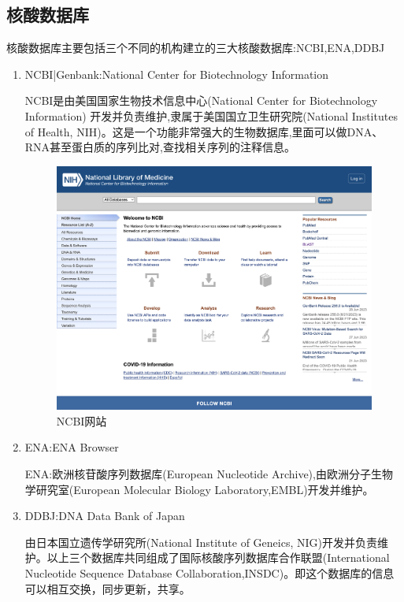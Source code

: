 \subsection {核酸数据库}
核酸数据库主要包括三个不同的机构建立的三大核酸数据库:NCBI,ENA,DDBJ
\begin{enumerate}
    \item NCBI|Genbank:National Center for Biotechnology Information

          NCBI是由美国国家生物技术信息中心(National Center for Biotechnology Information) 开发并负责维护,隶属于美国国立卫生研究院(National Institutes of Health, NIH)。这是一个功能非常强大的生物数据库,里面可以做DNA、RNA甚至蛋白质的序列比对,查找相关序列的注释信息。

          \begin{figure}[htbp]
              \centering
              \includegraphics[width=1.0\textwidth]{image/Alignment/NCBI.png}
              \caption{NCBI网站}
          \end{figure}

    \item ENA:ENA Browser

          ENA:欧洲核苷酸序列数据库(European Nucleotide Archive),由欧洲分子生物学研究室(European Molecular Biology Laboratory,EMBL)开发并维护。
    \item DDBJ:DNA Data Bank of Japan

          由日本国立遗传学研究所(National Institute of Geneics, NIG)开发并负责维护。以上三个数据库共同组成了国际核酸序列数据库合作联盟(International Nucleotide Sequence Database Collaboration,INSDC)。即这个数据库的信息可以相互交换，同步更新，共享。
\end{enumerate}

